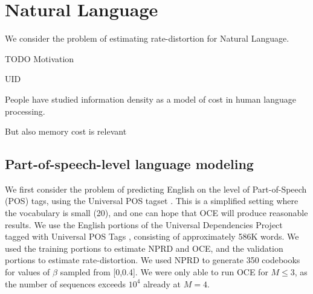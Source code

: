\documentclass[11pt,letterpaper]{article}
\newif \ifcomment
\newcommand\rljf[1]{\ifcomment{{\color{blue}(#1)}}\else{}\fi}
\begin{document}
\section{Natural Language}

We consider the problem of estimating rate-distortion for Natural Language.

TODO Motivation

UID


People have studied information density as a model of cost in human language processing.

But also memory cost is relevant

\cite{bentz2017entropy}

\cite{koplenig2017statistical}

\cite{dkebowski2018natural}

\cite{takahira2016entropy}

\rljf{Some motivation for why this is cool and interesting, maybe in parallel with the Bentz et al entropy paper, and other information theoretic linguistic complexity papers like Koplenig et al, and Dembowski's work}

\subsection{Part-of-speech-level language modeling}

We first consider the problem of predicting English on the level of Part-of-Speech (POS) tags, using the Universal POS tagset \citep{petrov-universal-2012}. 
This is a simplified setting where the vocabulary is small (20), and one can hope that OCE will produce reasonable results.
We use the English portions of the Universal Dependencies Project~\citep{nivre-universal-2017} tagged with Universal POS Tags \citep{petrov-universal-2012}, consisting of approximately 586K words.
We used the training portions to estimate NPRD and OCE, and the validation portions to estimate rate-distortion.
We used NPRD to generate 350 codebooks for values of $\beta$ sampled from [0,0.4].
We were only able to run OCE for $M \leq 3$, as the number of sequences exceeds $10^4$ already at $M=4$.
\end{document}
